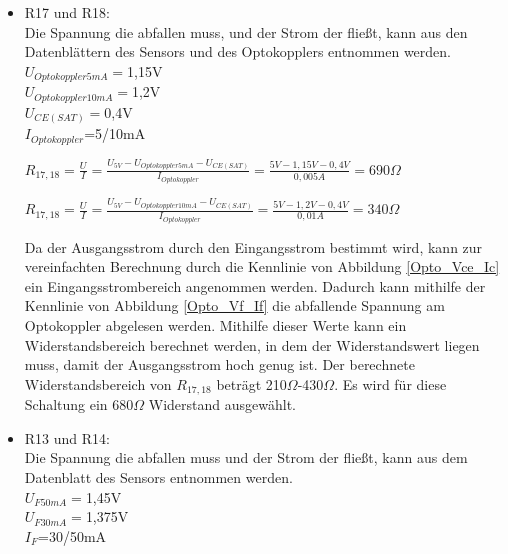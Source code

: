 \begin{itemize}
\item R17 und R18: \\
Die Spannung die abfallen muss, und der Strom der fließt, kann aus den Datenblättern des Sensors und des Optokopplers entnommen werden.\\
$U_{Optokoppler 5mA}=$1,15V \\
$U_{Optokoppler 10mA}=$1,2V \\
$U_{CE(SAT)}=$0,4V \\
$I_{Optokoppler}$=5/10mA \\

\begin{center}
$R_{17,18}=\frac{U}{I}=\frac{U_{5V}-U_{Optokoppler 5mA}-U_{CE(SAT)}}{I_{Optokoppler}}=\frac{5V-1,15V-0,4V}{0,005A}=690\Omega$
\end{center}

\begin{center}
$R_{17,18}=\frac{U}{I}=\frac{U_{5V}-U_{Optokoppler 10mA}-U_{CE(SAT)}}{I_{Optokoppler}}=\frac{5V-1,2V-0,4V}{0,01A}=340\Omega$
\end{center}

Da der Ausgangsstrom durch den Eingangsstrom bestimmt wird, kann zur vereinfachten Berechnung durch die Kennlinie von Abbildung \ref{Opto_Vce_Ic} ein Eingangsstrombereich angenommen werden. Dadurch kann mithilfe der Kennlinie von Abbildung \ref{Opto_Vf_If} die abfallende Spannung am Optokoppler abgelesen werden. Mithilfe dieser Werte kann ein Widerstandsbereich berechnet werden, in dem der Widerstandswert liegen muss, damit der Ausgangsstrom hoch genug ist. Der berechnete Widerstandsbereich von $R_{17,18}$ beträgt 210$\Omega$-430$\Omega$. Es wird für diese Schaltung ein 680$\Omega$ Widerstand ausgewählt.
\newpage
\item R13 und R14:\\
Die Spannung die abfallen muss und der Strom der fließt, kann aus dem Datenblatt des Sensors entnommen werden.\\
$U_{F 50mA}=$1,45V \\
$U_{F 30mA}=$1,375V \\
$I_{F}$=30/50mA \\


\end{itemize}
